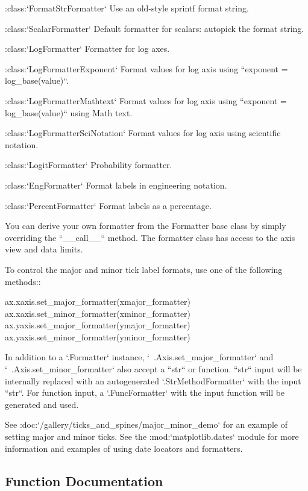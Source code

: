 \begin{DoxyVerb}
:class:`FormatStrFormatter`
    Use an old-style sprintf format string.

:class:`ScalarFormatter`
    Default formatter for scalars: autopick the format string.

:class:`LogFormatter`
    Formatter for log axes.

:class:`LogFormatterExponent`
    Format values for log axis using ``exponent = log_base(value)``.

:class:`LogFormatterMathtext`
    Format values for log axis using ``exponent = log_base(value)``
    using Math text.

:class:`LogFormatterSciNotation`
    Format values for log axis using scientific notation.

:class:`LogitFormatter`
    Probability formatter.

:class:`EngFormatter`
    Format labels in engineering notation.

:class:`PercentFormatter`
    Format labels as a percentage.

You can derive your own formatter from the Formatter base class by
simply overriding the ``__call__`` method. The formatter class has
access to the axis view and data limits.

To control the major and minor tick label formats, use one of the
following methods::

  ax.xaxis.set_major_formatter(xmajor_formatter)
  ax.xaxis.set_minor_formatter(xminor_formatter)
  ax.yaxis.set_major_formatter(ymajor_formatter)
  ax.yaxis.set_minor_formatter(yminor_formatter)

In addition to a `.Formatter` instance, `~.Axis.set_major_formatter` and
`~.Axis.set_minor_formatter` also accept a ``str`` or function.  ``str`` input
will be internally replaced with an autogenerated `.StrMethodFormatter` with
the input ``str``. For function input, a `.FuncFormatter` with the input
function will be generated and used.

See :doc:`/gallery/ticks_and_spines/major_minor_demo` for an
example of setting major and minor ticks. See the :mod:`matplotlib.dates`
module for more information and examples of using date locators and formatters.
\end{DoxyVerb}
 

\subsection{Function Documentation}
\mbox{\label{namespacematplotlib_1_1ticker_a1a1c817c485736b5b5596df17b647d11}} 
